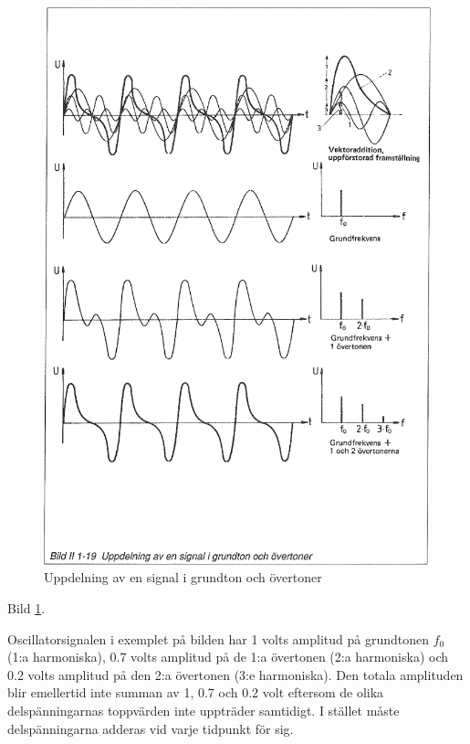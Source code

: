 \begin{figure}
\begin{center}
\includegraphics[width=14cm]{images/bild_2_1-19}
\caption{Uppdelning av en signal i grundton och övertoner}
\label{fig:BildII1-19}
\end{center}
\end{figure}

Bild \ref{fig:BildII1-19}.

Oscillatorsignalen i exemplet på bilden har 1 volts amplitud på grundtonen
\(f_0\) (1:a harmoniska), 0.7 volts amplitud på de 1:a övertonen
(2:a harmoniska) och 0.2 volts amplitud på den 2:a övertonen (3:e harmoniska).
Den totala amplituden blir emellertid inte summan av 1, 0.7 och 0.2 volt
eftersom de olika delspänningarnas toppvärden inte uppträder samtidigt.
I stället måste delspänningarna adderas vid varje tidpunkt för sig.

